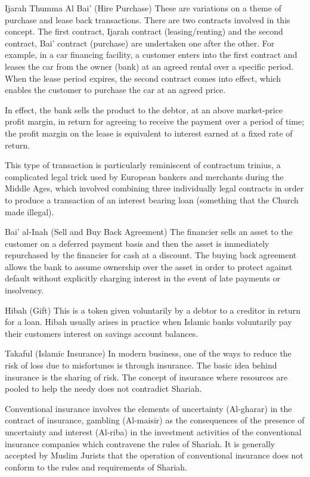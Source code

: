Ijarah Thumma Al Bai' (Hire Purchase)
These are variations on a theme of purchase and lease back transactions. There are two contracts involved in this concept. The first contract, Ijarah contract (leasing/renting) and the second contract, Bai' contract (purchase) are undertaken one after the other. For example, in a car financing facility, a customer enters into the first contract and leases the car from the owner (bank) at an agreed rental over a specific period. When the lease period expires, the second contract comes into effect, which enables the customer to purchase the car at an agreed price.

In effect, the bank sells the product to the debtor, at an above market-price profit margin, in return for agreeing to receive the payment over a period of time; the profit margin on the lease is equivalent to interest earned at a fixed rate of return.

This type of transaction is particularly reminiscent of contractum trinius, a complicated legal trick used by European bankers and merchants during the Middle Ages, which involved combining three individually legal contracts in order to produce a transaction of an interest bearing loan (something that the Church made illegal).


Bai' al-Inah (Sell and Buy Back Agreement)
The financier sells an asset to the customer on a deferred payment basis and then the asset is immediately repurchased by the financier for cash at a discount. The buying back agreement allows the bank to assume ownership over the asset in order to protect against default without explicitly charging interest in the event of late payments or insolvency.


Hibah (Gift)
This is a token given voluntarily by a debtor to a creditor in return for a loan. Hibah usually arises in practice when Islamic banks voluntarily pay their customers interest on savings account balances.

Takaful (Islamic Insurance)
In modern business, one of the ways to reduce the risk of loss due to misfortunes is through insurance. The basic idea behind insurance is the sharing of risk. The concept of insurance where resources are pooled to help the needy does not contradict Shariah.

Conventional insurance involves the elements of uncertainty (Al-gharar) in the contract of insurance, gambling (Al-maisir) as the consequences of the presence of uncertainty and interest (Al-riba) in the investment activities of the conventional insurance companies which contravene the rules of Shariah. It is generally accepted by Muslim Jurists that the operation of conventional insurance does not conform to the rules and requirements of Shariah.

